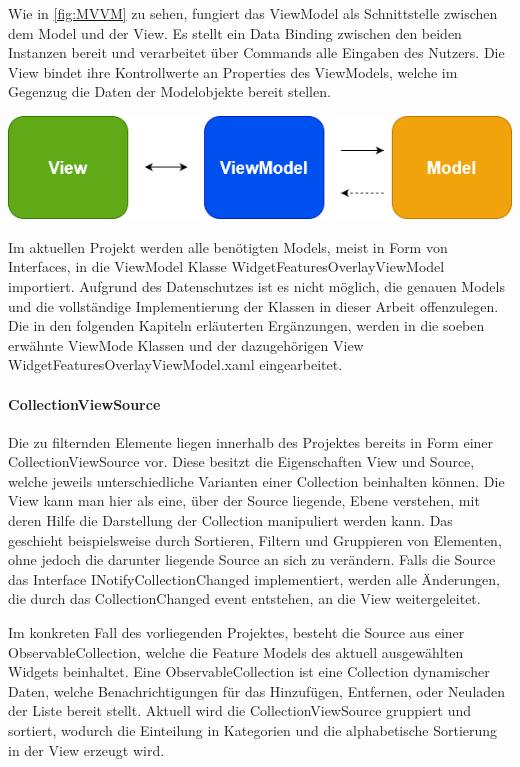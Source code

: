 Wie in \cref{fig:MVVM} zu sehen, fungiert das ViewModel als Schnittstelle zwischen dem Model und der View. Es stellt ein Data Binding zwischen den beiden Instanzen bereit und verarbeitet über Commands alle Eingaben des Nutzers.
Die View bindet ihre Kontrollwerte an Properties des ViewModels, welche im Gegenzug die Daten der Modelobjekte bereit stellen.

\newpage
\begin{center}
  \includegraphics[scale=0.6]{figures/MVVM.PNG}
  \label{fig:MVVM}
\end{center}

Im aktuellen Projekt werden alle benötigten Models, meist in Form von Interfaces, in die ViewModel Klasse WidgetFeaturesOverlayViewModel importiert.
Aufgrund des Datenschutzes ist es nicht möglich, die genauen Models und die vollständige Implementierung der Klassen in dieser Arbeit offenzulegen.
Die in den folgenden Kapiteln erläuterten Ergänzungen, werden in die soeben erwähnte ViewMode Klassen und der dazugehörigen View WidgetFeaturesOverlayViewModel.xaml eingearbeitet.

\paragraph{CollectionViewSource}
Die zu filternden Elemente liegen innerhalb des Projektes bereits in Form einer CollectionViewSource vor.
Diese besitzt die Eigenschaften View und Source, welche jeweils unterschiedliche Varianten einer Collection beinhalten können.
Die View kann man hier als eine, über der Source liegende, Ebene verstehen, mit deren Hilfe die Darstellung der Collection manipuliert werden kann.
Das geschieht beispielsweise durch Sortieren, Filtern und Gruppieren von Elementen, ohne jedoch die darunter liegende Source an sich zu verändern.
Falls die Source das Interface INotifyCollectionChanged implementiert, werden alle Änderungen, die durch das CollectionChanged event entstehen, an die View weitergeleitet.\cite{dotnetbot.}

Im konkreten Fall des vorliegenden Projektes, besteht die Source aus einer ObservableCollection, welche die Feature Models des aktuell ausgewählten Widgets beinhaltet.
Eine ObservableCollection ist eine Collection dynamischer Daten, welche Benachrichtigungen für das Hinzufügen, Entfernen, oder Neuladen der Liste bereit stellt.
\cite{dotnetbot.c}
Aktuell wird die CollectionViewSource gruppiert und sortiert, wodurch die Einteilung in Kategorien und die alphabetische Sortierung in der View erzeugt wird.

